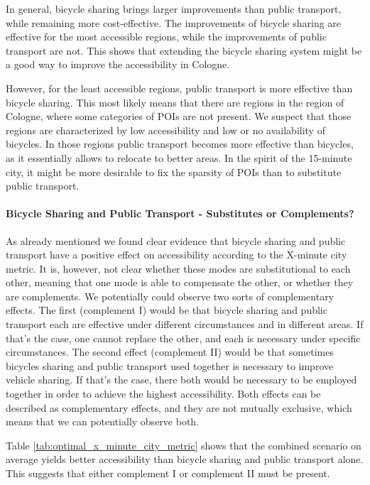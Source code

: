 In general, bicycle sharing brings larger improvements than public transport, while remaining more cost-effective.
The improvements of bicycle sharing are effective for the most accessible regions, while the improvements of public transport are not.
This shows that extending the bicycle sharing system might be a good way to improve the accessibility in Cologne.

However, for the least accessible regions, public transport is more effective than bicycle sharing.
This most likely means that there are regions in the region of Cologne, where some categories of POIs are not present.
We suspect that those regions are characterized by low accessibility and low or no availability of bicycles.
In those regions public transport becomes more effective than bicycles, as it essentially allows to relocate to better areas.
In the spirit of the 15-minute city, it might be more desirable to fix the sparsity of POIs than to substitute public transport.


\paragraph{Bicycle Sharing and Public Transport - Substitutes or Complements?}
As already mentioned we found clear evidence that bicycle sharing and public transport have a positive effect on accessibility according to the X-minute city metric.
It is, however, not clear whether these modes are substitutional to each other, meaning that one mode is able to compensate the other, or whether they are complements.
We potentially could observe two sorts of complementary effects.
The first (complement I) would be that bicycle sharing and public transport each are effective under different circumstances and in different areas.
If that's the case, one cannot replace the other, and each is necessary under specific circumstances.
The second effect (complement II) would be that sometimes bicycles sharing and public transport used together is necessary to improve vehicle sharing.
If that's the case, there both would be necessary to be employed together in order to achieve the highest accessibility.
Both effects can be described as complementary effects, and they are not mutually exclusive, which means that we can potentially observe both.


Table \ref{tab:optimal_x_minute_city_metric} shows that the combined scenario on average yields better accessibility than bicycle sharing and public transport alone.
This suggests that either complement I or complement II must be present.

